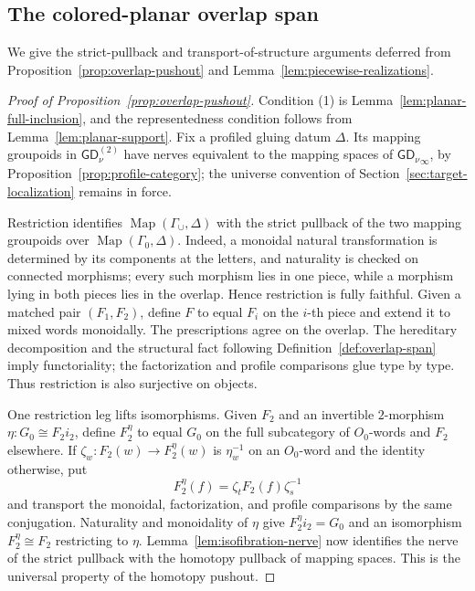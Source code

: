 \documentclass[11pt,letterpaper,twoside]{article}
\theoremstyle{plain}
\theoremstyle{definition}
\theoremstyle{remark}
\newcommand{\LGrm}{\mathsf{GD}_{\nu}}
\begin{document}
\subsection{The colored-planar overlap span}\label{app:overlap-details}

We give the strict-pullback and transport-of-structure arguments deferred from Proposition~\ref{prop:overlap-pushout} and Lemma~\ref{lem:piecewise-realizations}.

\begin{proof}[Proof of Proposition~\ref{prop:overlap-pushout}]
Condition (1) is Lemma~\ref{lem:planar-full-inclusion}, and the representedness condition follows from Lemma~\ref{lem:planar-support}.  Fix a profiled gluing datum \(\Delta\).  Its mapping groupoids in \(\LGrm^{(2)}\) have nerves equivalent to the mapping spaces of \({\LGrm}_\infty\), by Proposition~\ref{prop:profile-category}; the universe convention of Section~\ref{sec:target-localization} remains in force.

Restriction identifies \(\operatorname{Map}(\Gamma_\cup,\Delta)\) with the strict pullback of the two mapping groupoids over \(\operatorname{Map}(\Gamma_0,\Delta)\).  Indeed, a monoidal natural transformation is determined by its components at the letters, and naturality is checked on connected morphisms; every such morphism lies in one piece, while a morphism lying in both pieces lies in the overlap.  Hence restriction is fully faithful.  Given a matched pair \((F_1,F_2)\), define \(F\) to equal \(F_i\) on the \(i\)-th piece and extend it to mixed words monoidally.  The prescriptions agree on the overlap.  The hereditary decomposition and the structural fact following Definition~\ref{def:overlap-span} imply functoriality; the factorization and profile comparisons glue type by type.  Thus restriction is also surjective on objects.

One restriction leg lifts isomorphisms.  Given \(F_2\) and an invertible \(2\)-morphism \(\eta:G_0\cong F_2i_2\), define \(F_2^\eta\) to equal \(G_0\) on the full subcategory of \(O_0\)-words and \(F_2\) elsewhere.  If \(\zeta_w:F_2(w)\to F_2^\eta(w)\) is \(\eta_w^{-1}\) on an \(O_0\)-word and the identity otherwise, put
\[
 F_2^\eta(f)=\zeta_tF_2(f)\zeta_s^{-1}
\]
and transport the monoidal, factorization, and profile comparisons by the same conjugation.  Naturality and monoidality of \(\eta\) give \(F_2^\eta i_2=G_0\) and an isomorphism \(F_2^\eta\cong F_2\) restricting to \(\eta\).  Lemma~\ref{lem:isofibration-nerve} now identifies the nerve of the strict pullback with the homotopy pullback of mapping spaces.  This is the universal property of the homotopy pushout.
\end{proof}
\end{document}
